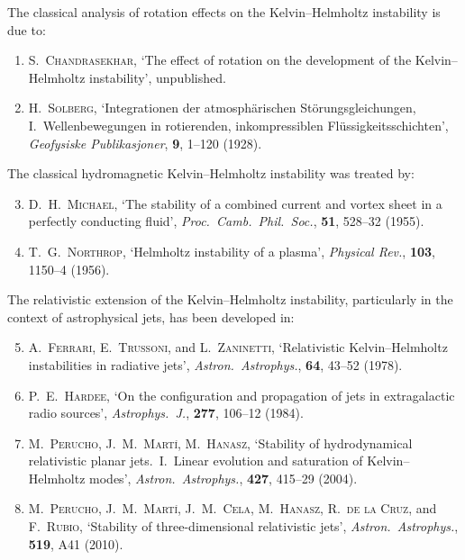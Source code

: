 The classical analysis of rotation effects on the Kelvin--Helmholtz
instability is due to:

\begin{enumerate}

\item \textsc{S.\ Chandrasekhar}, `The effect of rotation on the
  development of the Kelvin--Helmholtz instability', unpublished.

\item \textsc{H.\ Solberg}, `Integrationen der
  atmosph\"arischen St\"orungsgleichungen, I.\ Wellenbewegungen in
  rotierenden, inkompressiblen Fl\"ussigkeitsschichten',
  \emph{Geofysiske Publikasjoner}, \textbf{9}, 1--120 (1928).
\end{enumerate}

\medskip\noindent
The classical hydromagnetic Kelvin--Helmholtz instability was treated by:

\begin{enumerate}
\setcounter{enumi}{2}
\item \textsc{D.\ H.\ Michael}, `The stability of a combined current
  and vortex sheet in a perfectly conducting fluid',
  \emph{Proc.\ Camb.\ Phil.\ Soc.}, \textbf{51}, 528--32 (1955).

\item \textsc{T.\ G.\ Northrop}, `Helmholtz instability of a plasma',
  \emph{Physical Rev.}, \textbf{103}, 1150--4 (1956).
\end{enumerate}

\medskip\noindent
The relativistic extension of the Kelvin--Helmholtz instability,
particularly in the context of astrophysical jets, has been developed in:

\begin{enumerate}
\setcounter{enumi}{4}
\item \textsc{A.\ Ferrari}, \textsc{E.\ Trussoni}, and
  \textsc{L.\ Zaninetti}, `Relativistic Kelvin--Helmholtz instabilities
  in radiative jets', \emph{Astron.\ Astrophys.}, \textbf{64}, 43--52
  (1978).

\item \textsc{P.\ E.\ Hardee}, `On the configuration and propagation of
  jets in extragalactic radio sources',
  \emph{Astrophys.\ J.}, \textbf{277}, 106--12 (1984).

\item \textsc{M.\ Perucho}, \textsc{J.\ M.\ Mart\'{\i}},
  \textsc{M.\ Hanasz}, `Stability of hydrodynamical relativistic
  planar jets.\ I.\ Linear evolution and saturation of Kelvin--Helmholtz
  modes', \emph{Astron.\ Astrophys.}, \textbf{427}, 415--29 (2004).

\item \textsc{M.\ Perucho}, \textsc{J.\ M.\ Mart\'{\i}},
  \textsc{J.\ M.\ Cela}, \textsc{M.\ Hanasz}, \textsc{R.\ de la Cruz},
  and \textsc{F.\ Rubio}, `Stability of three-dimensional relativistic
  jets', \emph{Astron.\ Astrophys.}, \textbf{519}, A41 (2010).
\end{enumerate}

